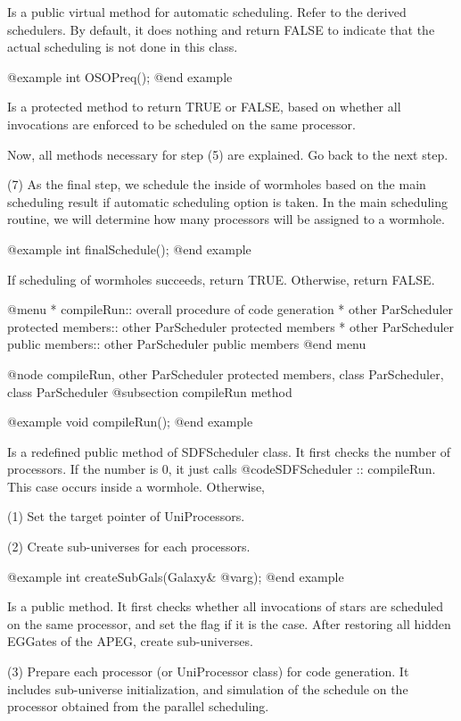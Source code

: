 Is a public virtual method for automatic scheduling. Refer to the derived
schedulers. By default, it does nothing and return FALSE to indicate that
the actual scheduling is not done in this class.

@example
int OSOPreq();
@end example

Is a protected method to return TRUE or FALSE, based on whether all
invocations are enforced to be scheduled on the same processor.

Now, all methods necessary for step (5) are explained. Go back to the next
step.

(7) As the final step, we schedule the inside of wormholes based on the
main scheduling result if automatic scheduling option is taken. 
In the main scheduling routine, we will determine
how many processors will be assigned to a wormhole.

@example
int finalSchedule();
@end example

If scheduling of wormholes succeeds, return TRUE. Otherwise, return FALSE.

@menu
* compileRun::				  overall procedure of code generation
* other ParScheduler protected members::  other ParScheduler protected members
* other ParScheduler public members::	  other ParScheduler public members
@end menu

@node compileRun, other ParScheduler protected members, class ParScheduler, class ParScheduler
@subsection compileRun method

@example
void compileRun();
@end example

Is a redefined public method of SDFScheduler class. It first checks the number
of processors. 
If the number is 0, it just calls @code{SDFScheduler :: compileRun}. This
case occurs inside a wormhole. Otherwise, 

(1) Set the target pointer of UniProcessors.

(2) Create sub-universes for each processors.

@example
int createSubGals(Galaxy& @var{g});
@end example

Is a public method. It first checks whether all invocations of stars are
scheduled on the same processor, and set the flag if it is the case.
After restoring all hidden EGGates of the APEG, create sub-universes.

(3) Prepare each processor (or UniProcessor class) for code generation.
It includes sub-universe initialization, and simulation of the schedule on
the processor obtained from the parallel scheduling.

